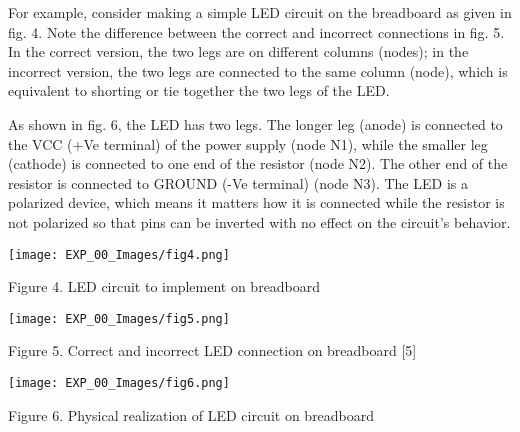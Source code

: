 \documentclass[12pt,a4paper]{article}
\begin{document}
\begin{justify}
\noindent For example, consider making a simple LED circuit on the breadboard as given in fig. 4. Note the difference between the correct and incorrect connections in fig. 5. In the correct version, the two legs are on different columns (nodes); in the incorrect version, the two legs are connected to the same column (node), which is equivalent to shorting or tie together the two legs of the LED.\par
\noindent As shown in fig. 6, the LED has two legs. The longer leg (anode) is connected to the VCC (+Ve terminal) of the power supply (node N1), while the smaller leg (cathode) is connected to one end of the resistor (node N2). The other end of the resistor is connected to GROUND (-Ve terminal) (node N3). The LED is a polarized device, which means it matters how it is connected while the resistor is not polarized so that pins can be inverted with no effect on the circuit's behavior. 


\begin{center} 
\texttt{[image: EXP\_00\_Images/fig4.png]}
\end{center}
\vspace{-8mm}
\begin{center} {Figure 4. LED circuit to implement on breadboard}\end{center}


\begin{center} 
\texttt{[image: EXP\_00\_Images/fig5.png]}
\end{center}
\vspace{-8mm}
\begin{center} {Figure 5. Correct and incorrect LED connection on breadboard [5]}\end{center}

\begin{center} 
\texttt{[image: EXP\_00\_Images/fig6.png]}
\end{center}
\vspace{-8mm}
\begin{center} {Figure 6. Physical realization of LED circuit on breadboard }\end{center}




\end{justify}
\end{document}
